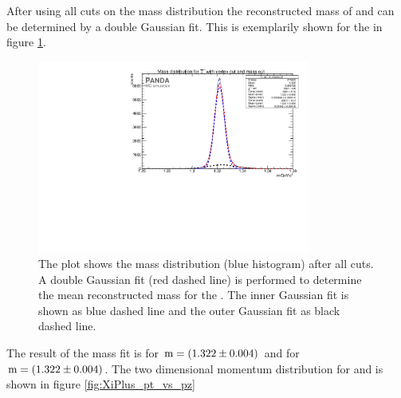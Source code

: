 		After using all cuts on the mass distribution the reconstructed mass of \cascade and \anticascade can be determined by a double Gaussian fit.
		This is exemplarily shown for the \cascade in figure \ref{fig:XiPlus_massfit}.
		
		\begin{figure}
			\centering
				\includegraphics[width=0.8\textwidth]{./plots/Xi/XiPlus_m_masscut.pdf}
			\caption{\propose The plot shows the mass distribution (blue histogram) after all cuts. 
					A double Gaussian fit (red dashed line) is performed to determine the mean reconstructed mass for the \anticascade. 
					The inner Gaussian fit is shown as blue dashed line and the outer Gaussian fit as black dashed line.}
			\label{fig:XiPlus_massfit}
		\end{figure}
		The result of the mass fit is for \anticascade ${\textnormal{m} = \left( 1.322 \pm 0.004\right)}$ \massunit 
		and for \cascade \\ ${\textnormal{m} = \left( 1.322 \pm 0.004\right)}$\massunit.
		The two dimensional momentum distribution for \anticascade and \cascade is shown in figure \ref{fig:XiPlus_pt_vs_pz} 
		
